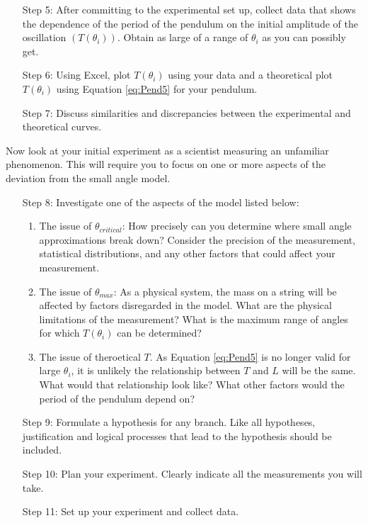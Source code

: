 \begin{itemize}[leftmargin = 50pt]
    \item[Step 5:] After committing to the experimental set up, collect data that shows the dependence of the period of the pendulum on the initial amplitude of the oscillation $(T(\theta_i))$. Obtain as large of a range of $\theta_i$ as you can possibly get.
    \item[Step 6:] Using Excel, plot $T(\theta_i)$ using your data and a theoretical plot $T(\theta_i)$ using Equation \ref{eq:Pend5} for your pendulum.
    \item[Step 7:] Discuss similarities and discrepancies between the experimental and theoretical curves.
\end{itemize}

Now look at your initial experiment as a scientist measuring an unfamiliar phenomenon. This will require you to focus on one or more aspects of the deviation from the small angle model. 


\begin{itemize}[leftmargin = 50pt]
    \item[Step 8:] Investigate one of the aspects of the model listed below: \begin{enumerate}
            \item The issue of $\theta_{critical}$: How precisely can you determine where small angle approximations break down? Consider the precision of the measurement, statistical distributions, and any other factors that could affect your measurement.
            \item The issue of $\theta_{max}$: As a physical system, the mass on a string will be affected by factors disregarded in the model. What are the physical limitations of the measurement? What is the maximum range of angles for which $T(\theta_i)$ can be determined?
            \item The issue of theroetical $T$. As Equation \ref{eq:Pend5} is no longer valid for large $\theta_i$, it is unlikely the relationship between $T$ and $L$ will be the same. What would that relationship look like? What other factors would the period of the pendulum depend on?
    \end{enumerate}
    \item[Step 9:] Formulate a hypothesis for any branch. Like all hypotheses, justification and logical processes that lead to the hypothesis should be included.
    \item[Step 10:] Plan your experiment. Clearly indicate all the measurements you will take.
    \item[Step 11:] Set up your experiment and collect data.
\end{itemize}


